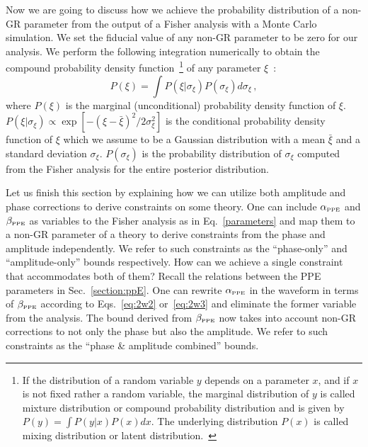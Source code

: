 \documentclass[prd,twocolumn,nofootinbib]{revtex4-1}
\newcommand\be{\begin{equation}}
\newcommand\ee{\end{equation}}
\newcommand{\lb}{\left(}
\newcommand{\rb}{\right)}
\newcommand{\PPE}{{\mbox{\tiny PPE}}}
\begin{document}
Now we are going to discuss how we achieve the probability distribution of a non-GR parameter from the output of a Fisher analysis with a Monte Carlo simulation. We set the  fiducial value of any non-GR parameter to be zero for our analysis. We perform the following integration numerically to obtain the compound probability density function~\footnote{If the distribution of a random variable $y$ depends on a parameter $x$, and if $x$ is not fixed rather a random variable, the marginal distribution of $y$ is called mixture distribution or compound probability distribution and is given by $P\left(y\right)=\int P\left(y|x\right) P\left(x\right)dx$. The underlying distribution $P\left(x\right)$ is called mixing distribution or latent distribution.~\cite{2016arXiv160204060R}} of any parameter $\xi$~:
\be
\label{eq3:1}
P\lb\xi\rb=\int P\lb \xi|\sigma_{\xi}\rb P\lb \sigma_{\xi}\rb d\sigma_{\xi}\,,
\ee
where $P\lb\xi\rb$ is the marginal (unconditional) probability density function of $\xi$. $P\lb \xi|\sigma_{\xi}\rb \propto \exp[-(\xi-\bar \xi)^2/2\sigma_{\xi}^2]$ is the conditional probability density function of $\xi$ which we assume to be a Gaussian distribution with a mean $\bar \xi$ and a standard deviation $\sigma_\xi$. $P\lb\sigma_\xi\rb$ is the probability distribution of $\sigma_\xi$ computed from the Fisher analysis for the entire posterior distribution.


Let us finish this section by explaining how we can utilize both amplitude and phase corrections to derive constraints on some theory. One can include $\alpha_{\PPE}$ and $\beta_{\PPE}$ as variables to the Fisher analysis as in Eq.~\eqref{parameters} and map them to a non-GR parameter of a theory to derive constraints from the phase and amplitude independently. We refer to such constraints as  the ``phase-only'' and ``amplitude-only'' bounds respectively. How can we achieve a single constraint that accommodates both of them? Recall the relations between the PPE parameters in Sec.~\ref{section:ppE}. One can rewrite $\alpha_{\PPE}$ in the waveform in terms of $\beta_{\PPE}$ according to Eqs.~\eqref{eq:2w2} or~\eqref{eq:2w3} and eliminate the former variable from the analysis. The bound derived from $\beta_{\PPE}$ now takes into account non-GR corrections to not only the phase but also the amplitude. We refer to such constraints as the ``phase \& amplitude combined'' bounds.
\end{document}
